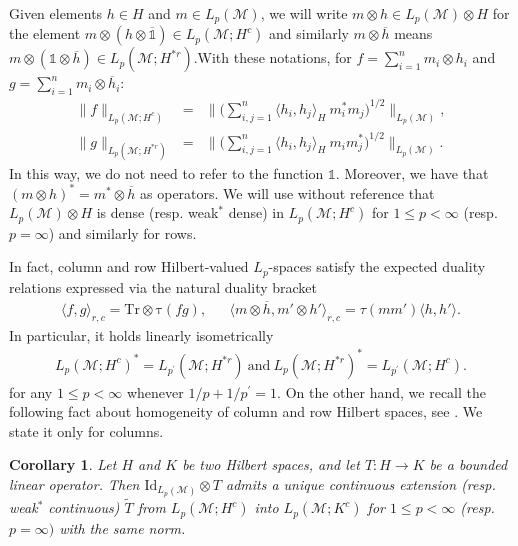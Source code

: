 \documentclass[psamsfonts]{amsart}
\newtheorem{corollary}[theorem]{Corollary}
\newcommand{\la}{\langle}
\newcommand{\ra}{\rangle}
\newcommand{\Lp}{L_p}
\newcommand{\Lpprime}{L_{p^\prime}}
\newcommand{\Hc}{H^c}
\newcommand{\Kc}{K^c}
\newcommand{\id}{\mathrm{Id}}
\begin{document}
    Given elements $h\in H$ and $m\in \Lp(\mathcal M)$, we will write
    $m\otimes h \in \Lp(\mathcal{M}) \otimes H$ for the element
    $m \otimes (h\otimes \overline{\mathds{1}})\in \Lp(\mathcal{M};\Hc)$ and similarly
   $m\otimes \overline h$  means $m \otimes (\mathds{1}\otimes \overline h)\in \Lp(\mathcal{M};H^{*r})$.With these notations,
    for $f=\sum_{i=1}^n m_i\otimes h_i$ and $g=\sum_{i=1}^n m_i\otimes \overline h_i$:
    \begin{eqnarray*}
      \|f\|_{\Lp(\mathcal{M};\Hc)} &=&  \Big\| \Big( \sum_{i,j=1}^n \langle h_i,h_j\rangle_H \ m_i^* m_j \Big)^{1/2}\Big\|_{\Lp(\mathcal{M})},\\
      \|g\|_{\Lp(\mathcal{M};H^{*r})} &=& \Big\| \Big( \sum_{i,j=1}^n \langle h_i,h_j\rangle_H \ m_i m_j^* \Big)^{1/2}\Big\|_{\Lp(\mathcal{M})}.
    \end{eqnarray*}
    In this way, we do not need to refer to the function $\mathds{1}$. Moreover, we have that $(m\otimes h)^*= m^* \otimes \overline h$ as operators. We will use without reference that $\Lp(\mathcal M)\otimes H$ is dense (resp. weak$^*$ dense) in $\Lp(\mathcal{M};\Hc)$ for $1\leq p<\infty$ (resp. $p=\infty$) and similarly for rows. 
                                              

    
    In fact, column and row Hilbert-valued $\Lp$-spaces satisfy the
    expected duality relations expressed via the natural duality bracket 
    \begin{align}
      \la f, g\ra_{r,c} = \mathrm{Tr\otimes \tau }(fg),& &
     \la m\otimes \overline h, m'\otimes h'\ra_{r,c}= \tau (mm') \la h,h'\ra . \label{eq:dualityBracket}
    \end{align}
    In particular, it holds linearly isometrically
    \begin{align*}
        \Lp(\mathcal{M};\Hc)^* = \Lpprime(\mathcal{M};H^{*r}) \ \mathrm{and} \ \Lp(\mathcal{M};H^{*r})^* = \Lpprime(\mathcal{M};\Hc).
    \end{align*}
for any $1 \leq p < \infty$ whenever $1/p + 1/p^\prime =1$. On the other hand, we recall the following fact about homogeneity of column and row Hilbert spaces, see \cite[Lemma 2.4]{JLX06}. We state it only for columns.

    \begin{corollary}\label{cor:extension}
      Let $H$ and $K$ be two Hilbert spaces, and let
      $T : H \longrightarrow K$ be a bounded linear operator. Then
      $\id_{L_p(\mathcal{M})} \otimes T$ admits a unique continuous 
      extension (resp. weak$^*$ continuous) $\widetilde{T}$ from $\Lp(\mathcal{M};\Hc)$ into
      $\Lp(\mathcal{M};\Kc)$ for $1\leq p<\infty$ (resp. $p=\infty)$ with the same norm. \end{corollary}
    
\end{document}
